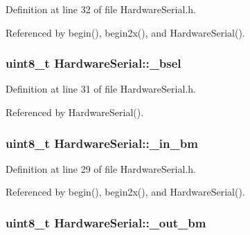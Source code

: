 Definition at line 32 of file HardwareSerial.h.



Referenced by begin(), begin2x(), and HardwareSerial().

\hypertarget{class_hardware_serial_acc6c13c76a56c8b4bb88c3385b7bc791}{
\subsubsection[{\_\-bsel}]{\setlength{\rightskip}{0pt plus 5cm}uint8\_\-t {\bf HardwareSerial::\_\-bsel}}}
\label{class_hardware_serial_acc6c13c76a56c8b4bb88c3385b7bc791}


Definition at line 31 of file HardwareSerial.h.



Referenced by HardwareSerial().

\hypertarget{class_hardware_serial_a8724fdfd3955eeff5d3ed535624ce79a}{
\subsubsection[{\_\-in\_\-bm}]{\setlength{\rightskip}{0pt plus 5cm}uint8\_\-t {\bf HardwareSerial::\_\-in\_\-bm}}}
\label{class_hardware_serial_a8724fdfd3955eeff5d3ed535624ce79a}


Definition at line 29 of file HardwareSerial.h.



Referenced by begin(), begin2x(), and HardwareSerial().

\hypertarget{class_hardware_serial_a751a284e15af72b026143a8091be1b70}{
\subsubsection[{\_\-out\_\-bm}]{\setlength{\rightskip}{0pt plus 5cm}uint8\_\-t {\bf HardwareSerial::\_\-out\_\-bm}}}
\label{class_hardware_serial_a751a284e15af72b026143a8091be1b70}


